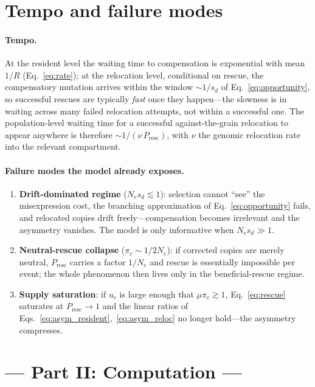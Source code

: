 \documentclass[11pt,a4paper]{article}
\newcommand{\Ne}{N_{e}}
\newcommand{\Presc}{P_{\mathrm{resc}}}
\begin{document}
\section{Tempo and failure modes}

\paragraph{Tempo.} At the resident level the waiting time to compensation is exponential with mean $1/R$ (Eq.~\ref{eq:rate}); at the relocation level, conditional on rescue, the compensatory mutation arrives within the window $\sim 1/s_d$ of Eq.~\eqref{eq:opportunity}, so successful rescues are typically \emph{fast} once they happen---the slowness is in waiting across many failed relocation attempts, not within a successful one. The population-level waiting time for a successful against-the-grain relocation to appear anywhere is therefore $\sim 1/(\nu\,\Presc)$, with $\nu$ the genomic relocation rate into the relevant compartment.

\paragraph{Failure modes the model already exposes.}
\begin{enumerate}
\item \textbf{Drift-dominated regime} ($\Ne s_d\lesssim 1$): selection cannot ``see'' the misexpression cost, the branching approximation of Eq.~\eqref{eq:opportunity} fails, and relocated copies drift freely---compensation becomes irrelevant and the asymmetry vanishes. The model is only informative when $\Ne s_d\gg 1$.
\item \textbf{Neutral-rescue collapse} ($\pi_c\sim1/2\Ne$): if corrected copies are merely neutral, $\Presc$ carries a factor $1/\Ne$ and rescue is essentially impossible per event; the whole phenomenon then lives only in the beneficial-rescue regime.
\item \textbf{Supply saturation}: if $u_c$ is large enough that $\mu\pi_c\gtrsim1$, Eq.~\eqref{eq:rescue} saturates at $\Presc\to1$ and the linear ratios of Eqs.~\eqref{eq:asym_resident},~\eqref{eq:asym_reloc} no longer hold---the asymmetry compresses.
\end{enumerate}

\section*{\centering --- Part II: Computation ---}
\end{document}
